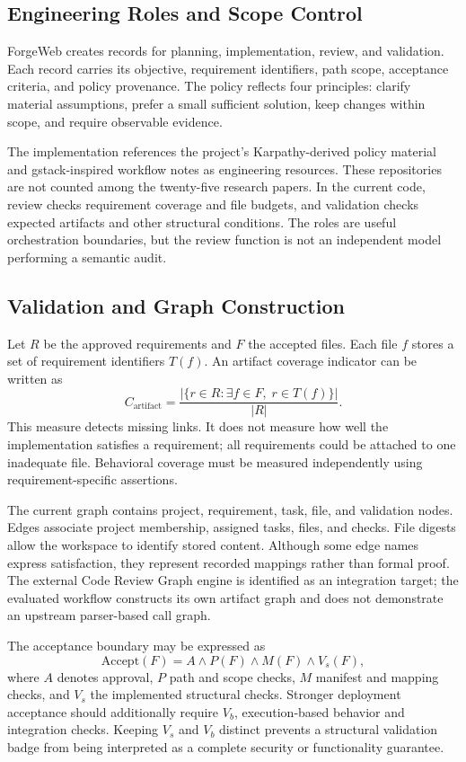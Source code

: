 \documentclass[conference,a4paper]{IEEEtran}
\begin{document}
\subsection{Engineering Roles and Scope Control}
ForgeWeb creates records for planning, implementation, review, and validation. Each record carries its objective, requirement identifiers, path scope, acceptance criteria, and policy provenance. The policy reflects four principles: clarify material assumptions, prefer a small sufficient solution, keep changes within scope, and require observable evidence.

The implementation references the project's Karpathy-derived policy material and gstack-inspired workflow notes as engineering resources. These repositories are not counted among the twenty-five research papers. In the current code, review checks requirement coverage and file budgets, and validation checks expected artifacts and other structural conditions. The roles are useful orchestration boundaries, but the review function is not an independent model performing a semantic audit.

\subsection{Validation and Graph Construction}
Let $R$ be the approved requirements and $F$ the accepted files. Each file $f$ stores a set of requirement identifiers $T(f)$. An artifact coverage indicator can be written as
\begin{equation}
C_{\mathrm{artifact}}=
\frac{|\{r\in R:\exists f\in F,\;r\in T(f)\}|}{|R|}.
\label{eq:coverage}
\end{equation}
This measure detects missing links. It does not measure how well the implementation satisfies a requirement; all requirements could be attached to one inadequate file. Behavioral coverage must be measured independently using requirement-specific assertions.

The current graph contains project, requirement, task, file, and validation nodes. Edges associate project membership, assigned tasks, files, and checks. File digests allow the workspace to identify stored content. Although some edge names express satisfaction, they represent recorded mappings rather than formal proof. The external Code Review Graph engine is identified as an integration target; the evaluated workflow constructs its own artifact graph and does not demonstrate an upstream parser-based call graph.

The acceptance boundary may be expressed as
\begin{equation}
\mathrm{Accept}(F)=A\land P(F)\land M(F)\land V_s(F),
\end{equation}
where $A$ denotes approval, $P$ path and scope checks, $M$ manifest and mapping checks, and $V_s$ the implemented structural checks. Stronger deployment acceptance should additionally require $V_b$, execution-based behavior and integration checks. Keeping $V_s$ and $V_b$ distinct prevents a structural validation badge from being interpreted as a complete security or functionality guarantee.
\end{document}
